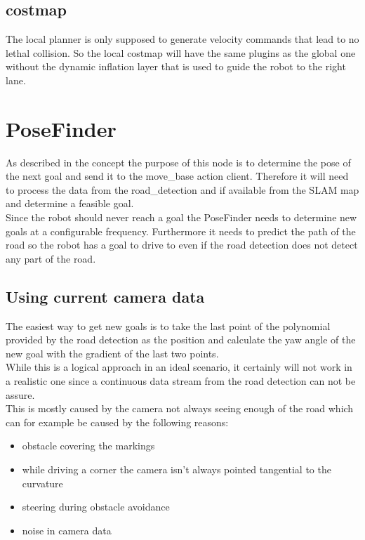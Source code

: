 \subsection{costmap}
The local planner is only supposed to generate velocity commands that lead to no lethal collision. So the local costmap will have the same plugins as the global one without the dynamic inflation layer that is used to guide the robot to the right lane.


\section{PoseFinder}
As described in the concept the purpose of this node is to determine the pose of the next goal and send it to the move\_base action client. Therefore it will need to process the data from the road\_detection and if available from the SLAM map and determine a feasible goal.\\
Since the robot should never reach a goal the PoseFinder needs to determine new goals at a configurable frequency. Furthermore it needs to predict the path of the road so the robot has a goal to drive to even if the road detection does not detect any part of the road.



\subsection{Using current camera data}
The easiest way to get new goals is to take the last point of the polynomial provided by the road detection as the position and calculate the yaw angle of the new goal with the gradient of the last two points.\\

While this is a logical approach in an ideal scenario, it certainly will not work in a realistic one since a continuous data stream from the road detection can not be assure.\\

This is mostly caused by the camera not always seeing enough of the road which can for example be caused by the following reasons:

\begin{itemize}
	\item obstacle covering the markings
	\item while driving a corner the camera isn't always pointed tangential to the curvature
	\item steering during obstacle avoidance
	\item noise in camera data
\end{itemize}


